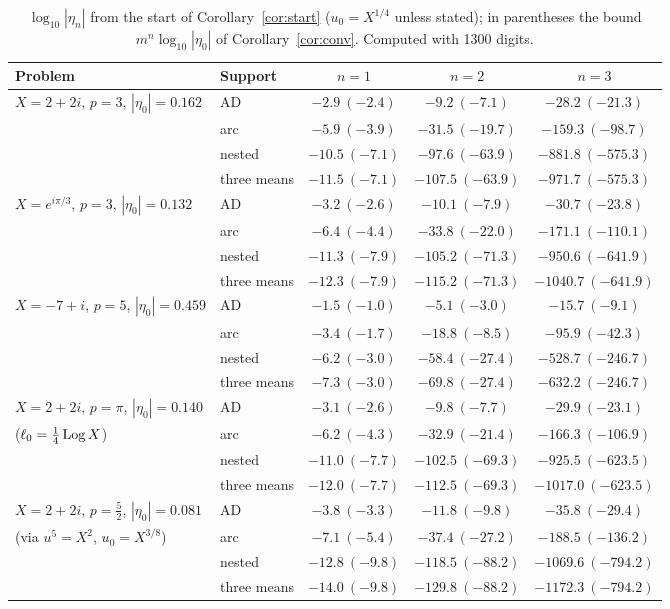 \documentclass[10pt,a4paper]{article}
\theoremstyle{plain}
\theoremstyle{remark}
\numberwithin{equation}{section}
\begin{document}
\begin{table}[h]
\centering\small
\begin{tabular}{@{}llccc@{}}
\toprule
Problem & Support & $n=1$ & $n=2$ & $n=3$\\
\midrule
$X=2+2i$, $p=3$, $|\eta_0|=0.162$ & AD & $-2.9\ (-2.4)$ & $-9.2\ (-7.1)$ & $-28.2\ (-21.3)$\\
 & arc & $-5.9\ (-3.9)$ & $-31.5\ (-19.7)$ & $-159.3\ (-98.7)$\\
 & nested & $-10.5\ (-7.1)$ & $-97.6\ (-63.9)$ & $-881.8\ (-575.3)$\\
 & three means & $-11.5\ (-7.1)$ & $-107.5\ (-63.9)$ & $-971.7\ (-575.3)$\\
\midrule
$X=e^{i\pi/3}$, $p=3$, $|\eta_0|=0.132$ & AD & $-3.2\ (-2.6)$ & $-10.1\ (-7.9)$ & $-30.7\ (-23.8)$\\
 & arc & $-6.4\ (-4.4)$ & $-33.8\ (-22.0)$ & $-171.1\ (-110.1)$\\
 & nested & $-11.3\ (-7.9)$ & $-105.2\ (-71.3)$ & $-950.6\ (-641.9)$\\
 & three means & $-12.3\ (-7.9)$ & $-115.2\ (-71.3)$ & $-1040.7\ (-641.9)$\\
\midrule
$X=-7+i$, $p=5$, $|\eta_0|=0.459$ & AD & $-1.5\ (-1.0)$ & $-5.1\ (-3.0)$ & $-15.7\ (-9.1)$\\
 & arc & $-3.4\ (-1.7)$ & $-18.8\ (-8.5)$ & $-95.9\ (-42.3)$\\
 & nested & $-6.2\ (-3.0)$ & $-58.4\ (-27.4)$ & $-528.7\ (-246.7)$\\
 & three means & $-7.3\ (-3.0)$ & $-69.8\ (-27.4)$ & $-632.2\ (-246.7)$\\
\midrule
$X=2+2i$, $p=\pi$, $|\eta_0|=0.140$ & AD & $-3.1\ (-2.6)$ & $-9.8\ (-7.7)$ & $-29.9\ (-23.1)$\\
\quad($\ell_0=\frac14\operatorname{Log} X$) & arc & $-6.2\ (-4.3)$ & $-32.9\ (-21.4)$ & $-166.3\ (-106.9)$\\
 & nested & $-11.0\ (-7.7)$ & $-102.5\ (-69.3)$ & $-925.5\ (-623.5)$\\
 & three means & $-12.0\ (-7.7)$ & $-112.5\ (-69.3)$ & $-1017.0\ (-623.5)$\\
\midrule
$X=2+2i$, $p=\frac52$, $|\eta_0|=0.081$ & AD & $-3.8\ (-3.3)$ & $-11.8\ (-9.8)$ & $-35.8\ (-29.4)$\\
\quad(via $u^{5}=X^{2}$, $u_0=X^{3/8}$) & arc & $-7.1\ (-5.4)$ & $-37.4\ (-27.2)$ & $-188.5\ (-136.2)$\\
 & nested & $-12.8\ (-9.8)$ & $-118.5\ (-88.2)$ & $-1069.6\ (-794.2)$\\
 & three means & $-14.0\ (-9.8)$ & $-129.8\ (-88.2)$ & $-1172.3\ (-794.2)$\\
\bottomrule
\end{tabular}
\caption{$\log_{10}|\eta_n|$ from the start of Corollary~\ref{cor:start} ($u_0=X^{1/4}$ unless
stated); in parentheses the bound $m^{n}\log_{10}|\eta_0|$ of Corollary~\ref{cor:conv}. Computed
with 1300 digits.}\label{tab:examples}
\end{table}
\end{document}
